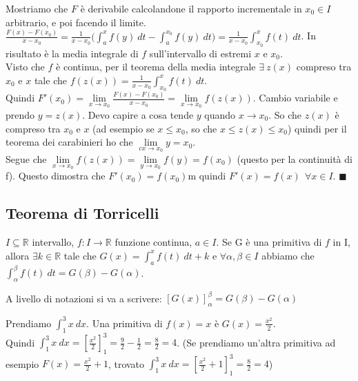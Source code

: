 \begin{demostration}
Mostriamo che $F$ è derivabile calcolandone il rapporto incrementale in $x_0 \in I$ arbitrario, e poi facendo il limite.\\
$\frac{F(x) - F(x_0)}{x - x_0} = \frac{1}{x - x_0}\big( \int_a^x f(y) \:dt - \int_a^{x_0} f(y) \:dt \big) = \frac{1}{x - x_0} \int_{x_0}^x f(t) \:dt$. In risultato è la media integrale di $f$ sull'intervallo di estremi $x$ e $x_0$.\\
Visto che $f$ è continua, per il teorema della media integrale $\exists \: z(x)$ compreso tra $x_0$ e $x$ tale che $f(z(x)) = \frac{1}{x - x_0} \int_{x_0}^x f(t) \:dt$.\\
Quindi $F'(x_0) = \lim\limits_{x\to x_0}\frac{F(x) - F(x_0)}{x - x_0} = \lim\limits_{x\to x_0}f(z(x))$. Cambio variabile e prendo $y = z(x)$. Devo capire a cosa tende $y$ quando $x\to x_0$. So che $z(x)$ è compreso tra $x_0$ e $x$ (ad esempio se $x \leq x_0$, so che $x \leq z(x) \leq x_0$) quindi per il teorema dei carabinieri ho che $\lim\limits_{cx \to x_0}y = x_0$.\\
Segue che $\lim\limits_{x \to x_0}f(z(x)) = \lim\limits_{y \to x_0} f(y) = f(x_0)$ (questo per la continuità di f). Questo dimostra che $F'(x_0) = f(x_0)$m quindi $F'(x) = f(x) \:\: \forall x \in I$. $\blacksquare$
\end{demostration}

\subsection{Teorema di Torricelli}
\begin{theorem}
$I \subseteq \mathbb{R}$ intervallo, $f: I \to \mathbb{R}$ funzione continua, $a \in I$. Se G è una primitiva di $f$ in I, allora $\exists k \in \mathbb{R}$ tale che $G(x) = \int_a^x f(t) \:dt + k$ e $\forall \alpha, \beta \in I$ abbiamo che $\int_{\alpha}^{\beta}f(t) \:dt = G(\beta) - G(\alpha)$.
\end{theorem}

\hspace{-15pt}A livello di notazioni si va a scrivere: $[G(x)]_{\alpha}^{\beta} = G(\beta) - G(\alpha)$

\begin{example}
Prendiamo $\int_1^3 x \:dx$. Una primitiva di $f(x) = x$ è $G(x) = \frac{x^2}{2}$. \\
Quindi $\int_1^3 x \:dx = [\frac{x^2}{2}]_1^3 = \frac{9}{2} - \frac{1}{2} = \frac{8}{2} = 4$. (Se prendiamo un'altra primitiva ad esempio $F(x) = \frac{x^2}{2} + 1$, trovato $\int_1^3 x \:dx = [\frac{x^2}{2} + 1]_1^3 = \frac{8}{2} = 4$)
\end{example}

